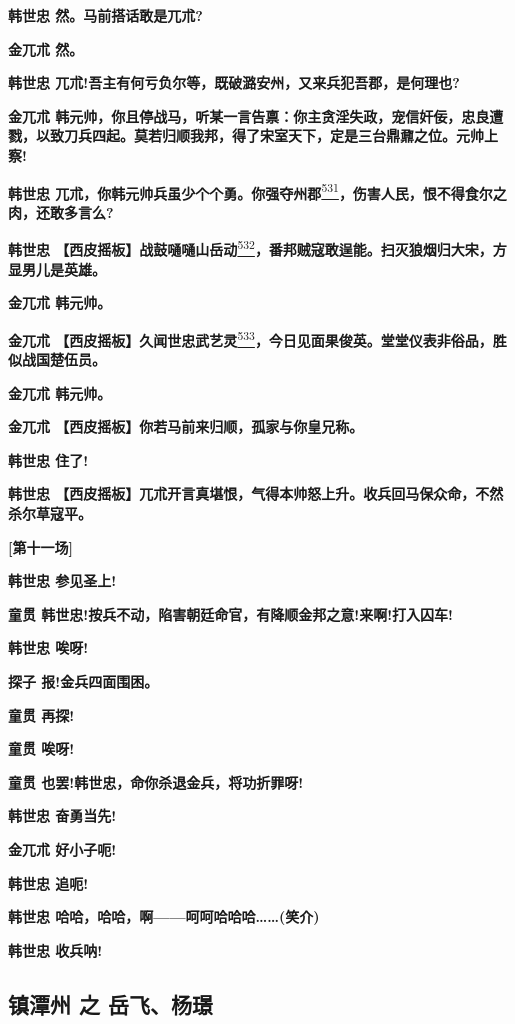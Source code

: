 \textbf{韩世忠 然。马前搭话敢是兀朮?}

\textbf{金兀朮 然。}

\textbf{韩世忠
兀朮!吾主有何亏负尔等，既破潞安州，又来兵犯吾郡，是何理也?}

\textbf{金兀朮
韩元帅，你且停战马，听某一言告禀：你主贪淫失政，宠信奸佞，忠良遭戮，以致刀兵四起。莫若归顺我邦，得了宋室天下，定是三台鼎鼐之位。元帅上察!}

\textbf{韩世忠
兀朮，你韩元帅兵虽少个个勇。你强夺州郡}\protect\hyperlink{fn531}{\textsuperscript{531}}\textbf{，伤害人民，恨不得食尔之肉，还敢多言么?}

\textbf{韩世忠
【西皮摇板】战鼓嗵嗵山岳动}\protect\hyperlink{fn532}{\textsuperscript{532}}\textbf{，番邦贼寇敢逞能。扫灭狼烟归大宋，方显男儿是英雄。}

\textbf{金兀朮 韩元帅。}

\textbf{金兀朮
【西皮摇板】久闻世忠武艺灵}\protect\hyperlink{fn533}{\textsuperscript{533}}\textbf{，今日见面果俊英。堂堂仪表非俗品，胜似战国楚伍员。}

\textbf{金兀朮 韩元帅。}

\textbf{金兀朮 【西皮摇板】你若马前来归顺，孤家与你皇兄称。}

\textbf{韩世忠 住了!}

\textbf{韩世忠
【西皮摇板】兀朮开言真堪恨，气得本帅怒上升。收兵回马保众命，不然杀尔草寇平。}

\textbf{{[}第十一场{]}}

\textbf{韩世忠 参见圣上!}

\textbf{童贯
韩世忠!按兵不动，陷害朝廷命官，有降顺金邦之意!来啊!打入囚车!}

\textbf{韩世忠 唉呀!}

\textbf{探子 报!金兵四面围困。}

\textbf{童贯 再探!}

\textbf{童贯 唉呀!}

\textbf{童贯 也罢!韩世忠，命你杀退金兵，将功折罪呀!}

\textbf{韩世忠 奋勇当先!}

\textbf{金兀朮 好小子呃!}

\textbf{韩世忠 追呃!}

\textbf{韩世忠 哈哈，哈哈，啊------呵呵哈哈哈\ldots{}\ldots{}(笑介)}

\textbf{韩世忠 收兵呐!}

\newpage
\hypertarget{ux9547ux6f6dux5dde-ux4e4b-ux5cb3ux98deux6768ux749f}{%
\subsection{镇潭州 之
岳飞、杨璟}\label{ux9547ux6f6dux5dde-ux4e4b-ux5cb3ux98deux6768ux749f}}

